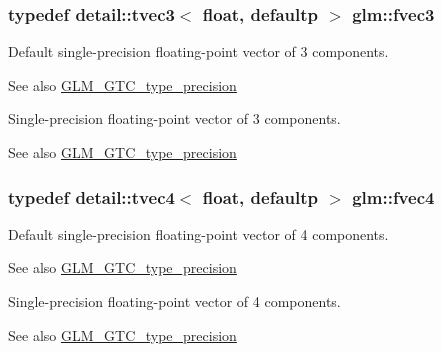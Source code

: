 \subsubsection[{\texorpdfstring{fvec3}{fvec3}}]{\setlength{\rightskip}{0pt plus 5cm}typedef detail\+::tvec3$<$ float, defaultp $>$ {\bf glm\+::fvec3}}\hypertarget{group__gtc__type__precision_ga33b85a14a8f68ec99029ff13db6af369}{}\label{group__gtc__type__precision_ga33b85a14a8f68ec99029ff13db6af369}
Default single-\/precision floating-\/point vector of 3 components. \begin{DoxySeeAlso}{See also}
\hyperlink{group__gtc__type__precision}{G\+L\+M\+\_\+\+G\+T\+C\+\_\+type\+\_\+precision}
\end{DoxySeeAlso}
Single-\/precision floating-\/point vector of 3 components. \begin{DoxySeeAlso}{See also}
\hyperlink{group__gtc__type__precision}{G\+L\+M\+\_\+\+G\+T\+C\+\_\+type\+\_\+precision} 
\end{DoxySeeAlso}
\subsubsection[{\texorpdfstring{fvec4}{fvec4}}]{\setlength{\rightskip}{0pt plus 5cm}typedef detail\+::tvec4$<$ float, defaultp $>$ {\bf glm\+::fvec4}}\hypertarget{group__gtc__type__precision_ga55d1365630d3b3ecf7c7f4e7c29a9cb1}{}\label{group__gtc__type__precision_ga55d1365630d3b3ecf7c7f4e7c29a9cb1}
Default single-\/precision floating-\/point vector of 4 components. \begin{DoxySeeAlso}{See also}
\hyperlink{group__gtc__type__precision}{G\+L\+M\+\_\+\+G\+T\+C\+\_\+type\+\_\+precision}
\end{DoxySeeAlso}
Single-\/precision floating-\/point vector of 4 components. \begin{DoxySeeAlso}{See also}
\hyperlink{group__gtc__type__precision}{G\+L\+M\+\_\+\+G\+T\+C\+\_\+type\+\_\+precision} 
\end{DoxySeeAlso}
